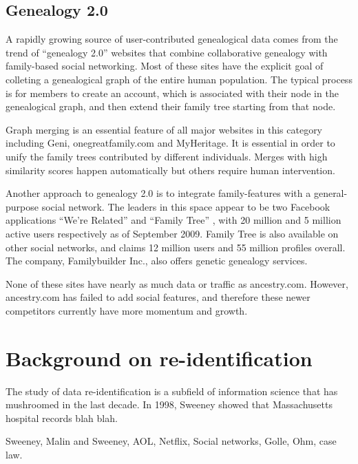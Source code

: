 \documentclass{article}
\begin{document}
\subsection{Genealogy 2.0} A rapidly growing source of user-contributed genealogical data comes from the trend of ``genealogy 2.0'' websites that combine collaborative genealogy with family-based social networking. Most of these sites have the explicit goal of colleting a genealogical graph of the entire human population. The typical process is for members to create an account, which is associated with their node in the genealogical graph, and then extend their family tree starting from that node.

Graph merging is  an essential feature of all major websites in this category including Geni\cite{geni-merge}, onegreatfamily.com\cite{onegreatfamily-merge} and MyHeritage\cite{myheritage-merge}.  It is essential in order to unify the family trees contributed by different individuals.  Merges with high similarity scores happen automatically but others require human intervention.

Another approach to genealogy 2.0 is to integrate family-features with a general-purpose social network. The leaders in this space appear to be two Facebook applications ``We're Related'' \cite{fb-wererelated} and ``Family Tree'' \cite{fb-familytree}, with 20 million and 5 million active users respectively as of September 2009. Family Tree is also available on other social networks, and claims 12 million users and 55 million profiles overall. 
The company, Familybuilder Inc., also offers genetic genealogy services.

None of these sites have nearly as much data or traffic as ancestry.com. However, ancestry.com has failed to add social features, and therefore these newer competitors currently have more momentum and growth.


\section{Background on re-identification}
The study of data re-identification is a subfield of information science that has mushroomed in the last decade. In 1998, Sweeney \cite{sweeney} showed that Massachusetts hospital records blah blah. 

 Sweeney, Malin and Sweeney, AOL, Netflix, Social networks, Golle, Ohm, case law.
\end{document}
